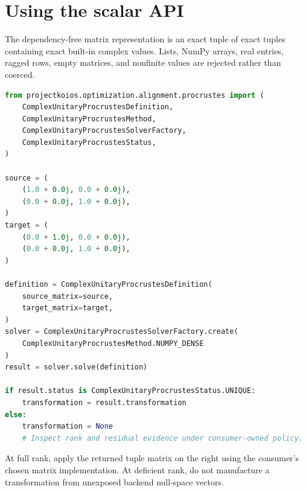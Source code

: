 \section{Using the scalar API}
The dependency-free matrix representation is an exact tuple of exact tuples containing
exact built-in complex values. Lists, NumPy arrays, real entries, ragged rows, empty
matrices, and nonfinite values are rejected rather than coerced.

\begin{lstlisting}[language=Python]
from projectkoios.optimization.alignment.procrustes import (
    ComplexUnitaryProcrustesDefinition,
    ComplexUnitaryProcrustesMethod,
    ComplexUnitaryProcrustesSolverFactory,
    ComplexUnitaryProcrustesStatus,
)

source = (
    (1.0 + 0.0j, 0.0 + 0.0j),
    (0.0 + 0.0j, 1.0 + 0.0j),
)
target = (
    (0.0 + 1.0j, 0.0 + 0.0j),
    (0.0 + 0.0j, 1.0 + 0.0j),
)

definition = ComplexUnitaryProcrustesDefinition(
    source_matrix=source,
    target_matrix=target,
)
solver = ComplexUnitaryProcrustesSolverFactory.create(
    ComplexUnitaryProcrustesMethod.NUMPY_DENSE
)
result = solver.solve(definition)

if result.status is ComplexUnitaryProcrustesStatus.UNIQUE:
    transformation = result.transformation
else:
    transformation = None
    # Inspect rank and residual evidence under consumer-owned policy.
\end{lstlisting}

At full rank, apply the returned tuple matrix on the right using the consumer's chosen
matrix implementation. At deficient rank, do not manufacture a transformation from
unexposed backend null-space vectors.

